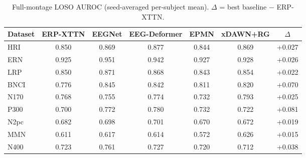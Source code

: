 \begin{table}[t]
\centering
\setlength{\tabcolsep}{5pt}
\caption{Full-montage LOSO AUROC (seed-averaged per-subject mean). $\Delta$ = best baseline $-$ ERP-XTTN.}
\label{tab:fullmontage}
\begin{tabular}{lcccccc}
\toprule
Dataset & ERP-XTTN & EEGNet & EEG-Deformer & EPMN & xDAWN+RG & $\Delta$ \\
\midrule
HRI & 0.850 & 0.869 & 0.877 & 0.844 & 0.869 & +0.027 \\
ERN & 0.925 & 0.951 & 0.942 & 0.927 & 0.928 & +0.026 \\
LRP & 0.850 & 0.871 & 0.868 & 0.843 & 0.854 & +0.022 \\
BNCI & 0.776 & 0.845 & 0.842 & 0.811 & 0.820 & +0.070 \\
N170 & 0.768 & 0.755 & 0.774 & 0.732 & 0.793 & +0.025 \\
P300 & 0.700 & 0.772 & 0.780 & 0.732 & 0.722 & +0.081 \\
N2pc & 0.682 & 0.698 & 0.701 & 0.670 & 0.672 & +0.019 \\
MMN & 0.611 & 0.617 & 0.614 & 0.572 & 0.626 & +0.015 \\
N400 & 0.723 & 0.761 & 0.727 & 0.720 & 0.712 & +0.038 \\
\bottomrule
\end{tabular}
\end{table}
